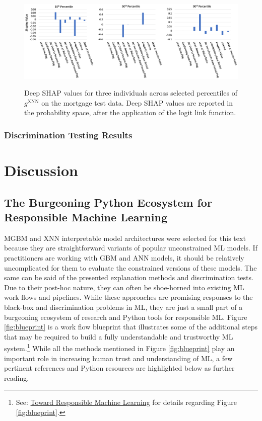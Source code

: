 \documentclass[information,article,submit,moreauthors,pdftex]{definitions/mdpi}
\begin{document}
\begin{figure}[H]
\centering
\includegraphics[width=15cm]{img/mort_xnn_loc.png}
\label{fig:mort_xnn_loc}
\caption{Deep SHAP values for three individuals across selected percentiles of $g^\text{XNN}$ on the mortgage test data. Deep SHAP values are reported in the probability space, after the application of the logit link function.}
\end{figure}

\subsubsection{Discrimination Testing Results}

\section{Discussion}\label{sec:disc}

\subsection{The Burgeoning Python Ecosystem for Responsible Machine Learning}

MGBM and XNN interpretable model architectures were selected for this text because they are straightforward variants of popular unconstrained ML models. If practitioners are working with GBM and ANN models, it should be relatively uncomplicated for them to evaluate the constrained versions of these models. The same can be said of the presented explanation methods and discrimination tests. Due to their post-hoc nature, they can often be shoe-horned into existing ML work flows and pipelines. While these approaches are promising responses to the black-box and discrimination problems in ML, they are just a small part of a burgeoning ecosystem of research and Python tools for responsible ML. Figure \ref{fig:blueprint} is a work flow blueprint that illustrates some of the additional steps that may be required to build a fully understandable and trustworthy ML system.\footnote{See: \href{https://github.com/jphall663/hc_ml}{Toward Responsible Machine Learning} for details regarding Figure \ref{fig:blueprint}.} While all the methods mentioned in Figure \ref{fig:blueprint} play an important role in increasing human trust and understanding of ML, a few pertinent references and Python resources are highlighted below as further reading. 
\end{document}
